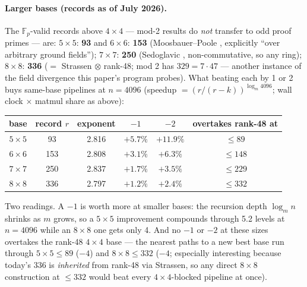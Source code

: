 \documentclass[10pt]{article}
\begin{document}
\paragraph{Larger bases (records as of July 2026).} The
$\mathbb{F}_p$-valid records above $4{\times}4$ --- mod-2 results
do \emph{not} transfer to odd proof primes --- are: $5{\times}5$:
\textbf{93} and $6{\times}6$: \textbf{153} (Moosbauer--Poole
\cite{mp25}, explicitly ``over arbitrary ground fields'');
$7{\times}7$: \textbf{250} (Sedoglavic \cite{sedo77},
non-commutative, so any ring); $8{\times}8$: \textbf{336}
($=$ Strassen $\otimes$ rank-48; mod 2 has $329 = 7\cdot47$ ---
another instance of the field divergence this paper's program
probes). What beating each by 1 or 2 buys same-base pipelines at
$n = 4096$ (speedup $= (r/(r{-}k))^{\log_m 4096}$; wall clock
$\times$ matmul share as above):
\begin{center}
\begin{tabular}{cccccc}
base & record $r$ & exponent & $-1$ & $-2$ & overtakes rank-48 at\\
\hline
$5{\times}5$ & 93 & 2.816 & $+5.7\%$ & $+11.9\%$ & $\le 89$\\
$6{\times}6$ & 153 & 2.808 & $+3.1\%$ & $+6.3\%$ & $\le 148$\\
$7{\times}7$ & 250 & 2.837 & $+1.7\%$ & $+3.5\%$ & $\le 229$\\
$8{\times}8$ & 336 & 2.797 & $+1.2\%$ & $+2.4\%$ & $\le 332$\\
\end{tabular}
\end{center}
Two readings. A $-1$ is worth more at smaller bases: the recursion
depth $\log_m n$ shrinks as $m$ grows, so a $5{\times}5$
improvement compounds through 5.2 levels at $n = 4096$ while an
$8{\times}8$ one gets only 4. And no $-1$ or $-2$ at these sizes
overtakes the rank-48 $4{\times}4$ base --- the nearest paths to a
new best base run through $5{\times}5 \le 89$ ($-4$) and
$8{\times}8 \le 332$ ($-4$; especially interesting because
today's 336 is \emph{inherited} from rank-48 via Strassen, so any
direct $8{\times}8$ construction at $\le 332$ would beat every
$4{\times}4$-blocked pipeline at once).
\end{document}
